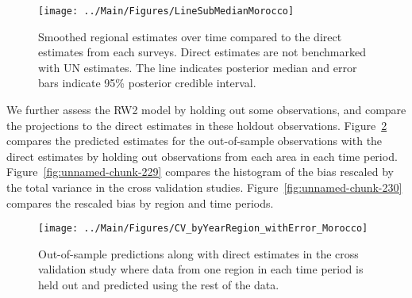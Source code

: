 \documentclass[12pt]{article}\usepackage[]{graphicx}\usepackage[]{color}
\newenvironment{knitrout}{}{} %
\begin{document}
\begin{knitrout}
\color{fgcolor}\begin{figure}[bht]

{\centering \texttt{[image: ../Main/Figures/LineSubMedianMorocco]} 

}

\caption[Smoothed regional estimates over time compared to the direct estimates from each surveys]{Smoothed regional estimates over time compared to the direct estimates from each surveys. Direct estimates are not benchmarked with UN estimates. The line indicates posterior median and error bars indicate 95\% posterior credible interval.}\label{fig:unnamed-chunk-227}
\end{figure}


\end{knitrout}
We further assess the RW2 model by holding out some observations, and compare the projections to the direct estimates in these holdout observations. Figure~\ref{fig:unnamed-chunk-228} compares the predicted estimates for the out-of-sample observations  with the direct estimates by holding out observations from each area in each time period.  Figure~\ref{fig:unnamed-chunk-229} compares the histogram of the bias rescaled by the total variance in the cross validation studies. Figure~\ref{fig:unnamed-chunk-230} compares the rescaled bias by region and time periods.



 
\begin{knitrout}
\color{fgcolor}\begin{figure}[bht]

{\centering \texttt{[image: ../Main/Figures/CV\_byYearRegion\_withError\_Morocco]} 

}

\caption[Out-of-sample predictions along with direct estimates in the cross validation study where data from one region in each time period is held out and predicted using the rest of the data]{Out-of-sample predictions along with direct estimates in the cross validation study where data from one region in each time period is held out and predicted using the rest of the data.}\label{fig:unnamed-chunk-228}
\end{figure}


\end{knitrout}
\end{document}
